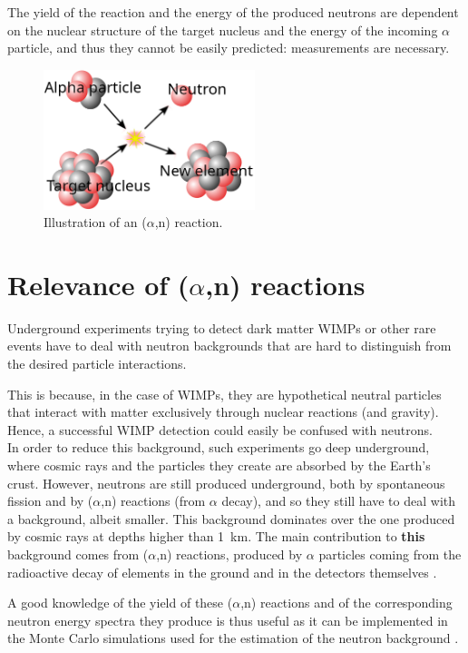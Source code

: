 \documentclass[a4paper,12pt]{report}
\newcommand{\an}{($\alpha$,n) }
\begin{document}
The yield of the reaction and the energy of the produced neutrons are dependent on the nuclear structure of the target nucleus and the energy of the incoming $\alpha$ particle, and thus they cannot be easily predicted: measurements are necessary.

\begin{figure}[H]
	\centering
	\includegraphics[width=0.55\textwidth]{anreaction.png}
	\caption{Illustration of an \an reaction.}
	\label{anreaction}
\end{figure}

\section{Relevance of \an reactions}
Underground experiments trying to detect dark matter WIMPs or other rare events have to deal with neutron backgrounds that are hard to distinguish from the desired particle interactions.

This is because, in the case of WIMPs, they are hypothetical neutral particles that interact with matter exclusively through nuclear reactions (and gravity).
Hence, a successful WIMP detection could easily be confused with neutrons.
\\

In order to reduce this background, such experiments go deep underground, where cosmic rays and the particles they create are absorbed by the Earth's crust.
However, neutrons are still produced underground, both by spontaneous fission and by \an reactions (from $\alpha$ decay), and so they still have to deal with a background, albeit smaller.
This background dominates over the one produced by cosmic rays at depths higher than \qty{1}{\kilo\meter}.
The main contribution to \textbf{this} background comes from \an reactions, produced by $\alpha$ particles coming from the radioactive decay of elements in the ground and in the detectors themselves \cite{neutron_in_an}.

A good knowledge of the yield of these \an reactions and of the corresponding neutron energy spectra they produce is thus useful as it can be implemented in the Monte Carlo simulations used for the estimation of the neutron background \cite{angeant4}.
\\
\end{document}
